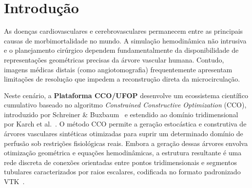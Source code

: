 \documentclass[11pt, a4paper]{article}
\begin{document}
\vspace{0.4cm}

\section{Introdução}

As doenças cardiovasculares e cerebrovasculares permanecem entre as principais causas de morbimortalidade no mundo. A simulação hemodinâmica não intrusiva e o planejamento cirúrgico dependem fundamentalmente da disponibilidade de representações geométricas precisas da árvore vascular humana. Contudo, imagens médicas distais (como angiotomografia) frequentemente apresentam limitações de resolução que impedem a reconstrução direta da microcirculação.

Neste cenário, a \textbf{Plataforma CCO/UFOP} desenvolve um ecossistema científico cumulativo baseado no algoritmo \emph{Constrained Constructive Optimization} (CCO), introduzido por Schreiner \& Buxbaum~\cite{schreiner1993} e estendido ao domínio tridimensional por Karch et al.~\cite{karch1999cco}. O método CCO permite a geração estocástica e construtiva de árvores vasculares sintéticas otimizadas para suprir um determinado domínio de perfusão sob restrições fisiológicas reais. Embora a geração dessas árvores envolva otimização geométrica e equações hemodinâmicas, a estrutura resultante é uma rede discreta de conexões orientadas entre pontos tridimensionais e segmentos tubulares caracterizados por raios escalares, codificada no formato padronizado VTK~\cite{vtkformat}.
\end{document}
